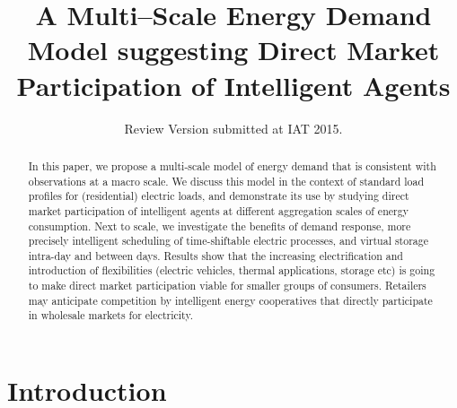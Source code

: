\documentclass[conference]{IEEEtran}
\begin{document}
\title{A Multi--Scale Energy Demand Model suggesting Direct Market Participation of Intelligent Agents}
\author{Review Version submitted at IAT 2015.%
}

\maketitle

\begin{abstract} In this paper, we propose a multi-scale model of energy demand that is consistent with observations at a macro scale. We discuss this model in the context of standard load profiles for (residential) electric loads, and demonstrate its use by studying direct market participation of intelligent agents at different aggregation scales of energy consumption. Next to scale, we investigate the benefits of demand response, more precisely intelligent scheduling of time-shiftable electric processes, and virtual storage intra-day and between days. Results show that the increasing electrification and introduction of flexibilities (electric vehicles, thermal applications, storage etc) is going to make direct market participation viable for smaller groups of consumers. Retailers may anticipate competition by intelligent energy cooperatives that directly participate in wholesale markets for electricity.
\end{abstract}
\IEEEpeerreviewmaketitle

\section{Introduction}
\label{sec:Introduction}
\end{document}
